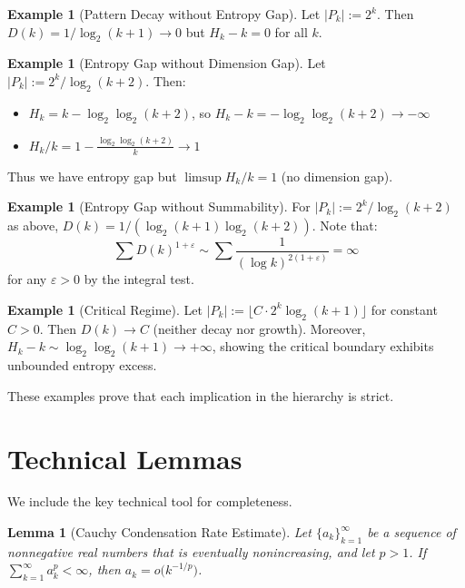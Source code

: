 \documentclass[11pt]{article}
\newtheorem{lemma}[theorem]{Lemma}
\theoremstyle{definition}
\newtheorem{example}[theorem]{Example}
\newcommand{\eps}{\varepsilon}
\begin{document}
\begin{example}[Pattern Decay without Entropy Gap]\label{ex:no-gap}
Let $|P_k| := 2^k$. Then $D(k) = 1/\log_2(k+1) \to 0$ but $H_k - k = 0$ for all $k$.
\end{example}

\begin{example}[Entropy Gap without Dimension Gap]\label{ex:entropy-no-dim}
Let $|P_k| := 2^k/\log_2(k+2)$. Then:
\begin{itemize}
\item $H_k = k - \log_2\log_2(k+2)$, so $H_k - k = -\log_2\log_2(k+2) \to -\infty$
\item $H_k/k = 1 - \frac{\log_2\log_2(k+2)}{k} \to 1$
\end{itemize}
Thus we have entropy gap but $\limsup H_k/k = 1$ (no dimension gap).
\end{example}

\begin{example}[Entropy Gap without Summability]\label{ex:gap-no-sum}
For $|P_k| := 2^k/\log_2(k+2)$ as above, $D(k) = 1/(\log_2(k+1)\log_2(k+2))$. Note that:
$$\sum D(k)^{1+\eps} \sim \sum \frac{1}{(\log k)^{2(1+\eps)}} = \infty$$
for any $\eps > 0$ by the integral test.
\end{example}

\begin{example}[Critical Regime]\label{ex:critical}
Let $|P_k| := \lfloor C \cdot 2^k \log_2(k+1) \rfloor$ for constant $C > 0$. Then $D(k) \to C$ (neither decay nor growth). Moreover, $H_k - k \sim \log_2\log_2(k+1) \to +\infty$, showing the critical boundary exhibits unbounded entropy excess.
\end{example}

These examples prove that each implication in the hierarchy is strict.


\section{Technical Lemmas}

We include the key technical tool for completeness.

\begin{lemma}[Cauchy Condensation Rate Estimate]\label{lem:dyadic}
Let $\{a_k\}_{k=1}^\infty$ be a sequence of nonnegative real numbers that is eventually nonincreasing, and let $p>1$. If $\sum_{k=1}^\infty a_k^{p}<\infty$, then $a_k=o\big(k^{-1/p}\big)$.
\end{lemma}
\end{document}
